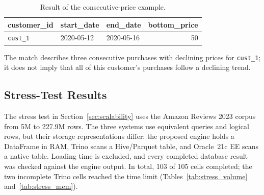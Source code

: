 \documentclass[preprint,12pt,times,a4paper]{elsarticle}
\begin{document}
\begin{table}[H]
\centering\small
\begin{tabular}{l l l r}
\toprule
\textbf{customer\_id} & \textbf{start\_date} & \textbf{end\_date} & \textbf{bottom\_price} \\
\midrule
\texttt{cust\_1} & 2020-05-12 & 2020-05-16 & 50 \\
\bottomrule
\end{tabular}
\caption{Result of the consecutive-price example.}
\label{tab:worked-output}
\end{table}

The match describes three consecutive purchases with declining prices for
\texttt{cust\_1}; it does not imply that all of this customer's purchases
follow a declining trend.

\onecolumn
\raggedbottom
\subsection{Stress-Test Results}
\label{app:stress-tables}

The stress test in Section~\ref{sec:scalability} uses the Amazon Reviews 2023
corpus from 5M to 227.9M rows. The three systems use equivalent queries and
logical rows, but their storage representations differ: the proposed engine
holds a DataFrame in RAM, Trino scans a Hive/Parquet table, and Oracle~21c EE
scans a native table. Loading time is excluded, and every completed database
result was checked against the engine output. In total, 103 of 105 cells
completed; the two incomplete Trino cells reached the time limit
(Tables~\ref{tab:stress_volume} and~\ref{tab:stress_mem}).
\end{document}
